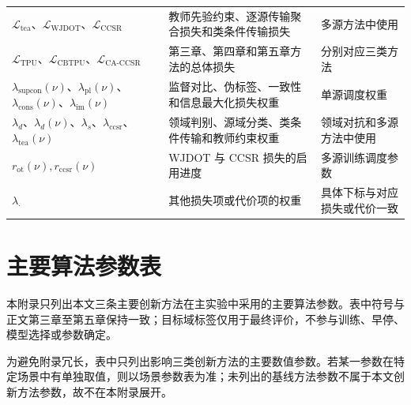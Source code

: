 \documentclass{seuthesis-2022}
\begin{document}
{\begin{longtable}{@{}>{\raggedright\arraybackslash}p{}>{\raggedright\arraybackslash}p{}>{\raggedright\arraybackslash}p{}@{}}
    $\mathcal{L}_{\mathrm{tea}}$、$\mathcal{L}_{\mathrm{WJDOT}}$、$\mathcal{L}_{\mathrm{CCSR}}$ & 教师先验约束、逐源传输聚合损失和类条件传输损失 & 多源方法中使用 \\
    $\mathcal{L}_{\mathrm{TPU}}$、$\mathcal{L}_{\mathrm{CBTPU}}$、$\mathcal{L}_{\mathrm{CA}\text{-}\mathrm{CCSR}}$ & 第三章、第四章和第五章方法的总体损失 & 分别对应三类方法 \\
    $\lambda_{\mathrm{supcon}}(\nu)$、$\lambda_{\mathrm{pl}}(\nu)$、$\lambda_{\mathrm{cons}}(\nu)$、$\lambda_{\mathrm{im}}(\nu)$ & 监督对比、伪标签、一致性和信息最大化损失权重 & 单源调度权重 \\
    $\lambda_d$、$\lambda_d(\nu)$、$\lambda_s$、$\lambda_{\mathrm{ccsr}}$、$\lambda_{\mathrm{tea}}(\nu)$ & 领域判别、源域分类、类条件传输和教师约束权重 & 领域对抗和多源方法中使用 \\
    $r_{\mathrm{ot}}(\nu),r_{\mathrm{ccsr}}(\nu)$ & WJDOT 与 CCSR 损失的启用进度 & 多源训练调度参数 \\
    $\lambda_{\cdot}$ & 其他损失项或代价项的权重 & 具体下标与对应损失或代价一致 \\
\end{longtable}
}

\cleardoublepage
\chapter{主要算法参数表}
\label{app:seed42_mainline_config}

本附录只列出本文三条主要创新方法在主实验中采用的主要算法参数。表中符号与正文第三章至第五章保持一致；目标域标签仅用于最终评价，不参与训练、早停、模型选择或参数确定。

为避免附录冗长，表中只列出影响三类创新方法的主要数值参数。若某一参数在特定场景中有单独取值，则以场景参数表为准；未列出的基线方法参数不属于本文创新方法参数，故不在本附录展开。
\end{document}
